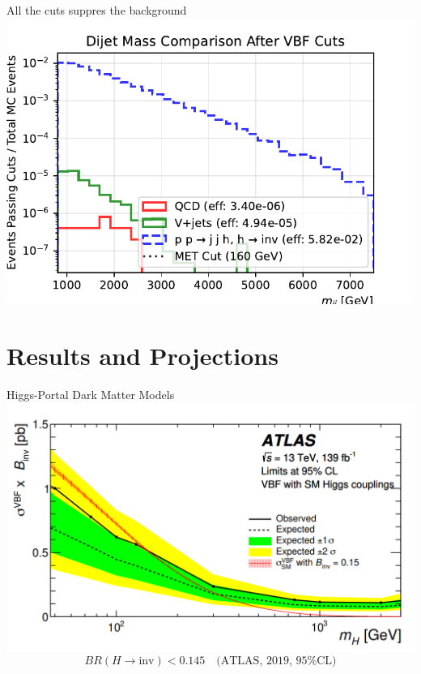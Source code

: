 \documentclass{../../bredelebeamer}
\begin{document}
\begin{frame}{All the cuts suppres the background}
    \includegraphics[width=.95\textwidth]{../Images/met_comparison_after_vbf_cuts.pdf}
\end{frame}


\section{Results and Projections}
\begin{frame}{Higgs-Portal Dark Matter Models}
    \includegraphics[width=\textwidth]{../Images/Altas_Result.png}
    $$
        BR(H \to \text{inv}) < 0.145 \quad \text{(ATLAS, 2019, 95\% CL)}
    $$
\end{frame}
\end{document}
